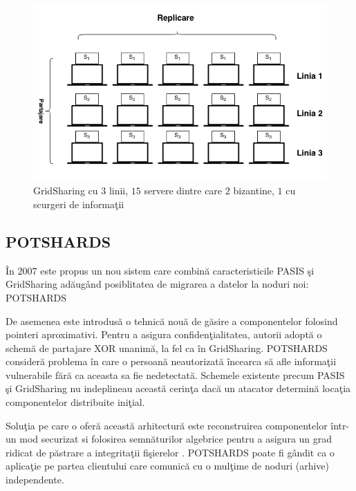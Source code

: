 \documentclass{llncs}
\newcommand{\todo}[1]{{\color{red}{TODO #1}}}
\begin{document}
\begin{figure}
	\includegraphics[width=12cm]{img/GridSharing.png}    %
	\caption{GridSharing cu $3$ linii, $15$ servere dintre care $2$ bizantine, $1$ cu scurgeri de informa\c{t}ii \todo{citare}}
	\label{fig:grid_sharing}
	\bigskip
\end{figure}


\subsection{POTSHARDS} 
\label{sec:desc_potshards}
\^{I}n $2007$ este propus un nou sistem care combin\u{a} caracteristicile PASIS \c{s}i GridSharing ad\u{a}ug\^{a}nd posiblitatea de migrarea a datelor la noduri noi: POTSHARDS \todo{(Protection Over Time, Securely Harboring
And Reliably Distributing Stuff)) - mereu prima data cand folosesti o abreviere trebuie sa o explici}

\todo{cite! se citeaza la inceput}

De asemenea este introdus\u{a} o tehnic\u{a} nou\u{a} de g\u{a}sire a componentelor folosind pointeri aproximativi. Pentru a asigura confiden\c{t}ialitatea, autorii adopt\u{a} o schem\u{a} de partajare XOR unanim\u{a}, la fel ca \^{i}n GridSharing.
POTSHARDS consider\u{a} problema \^{i}n care o persoan\u{a} neautorizat\u{a} \^{i}ncearca s\u{a} afle informa\c{t}ii vulnerabile f\u{a}r\u{a} ca aceasta sa fie nedetectat\u{a}. Schemele existente precum PASIS \c{s}i GridSharing nu indeplineau aceast\u{a} cerin\c{t}a dac\u{a} un atacator determin\u{a} loca\c{t}ia componentelor distribuite ini\c{t}ial.
\todo{nu inteleg - reformulare, explica ce vrei sa zici!}

Solu\c{t}ia pe care o ofer\u{a} aceast\u{a} arhitectur\u{a} este reconstruirea componentelor \^{i}ntr-un mod securizat si folosirea semn\u{a}turilor algebrice pentru a asigura un grad ridicat de p\u{a}strare a integrita\c{t}ii fi\c{s}ierelor \cite{STM:2006}.
POTSHARDS poate fi g\^{a}ndit ca o aplica\c{t}ie pe partea clientului care comunic\u{a} cu o mul\c{t}ime de noduri (arhive) independente.
\end{document}
